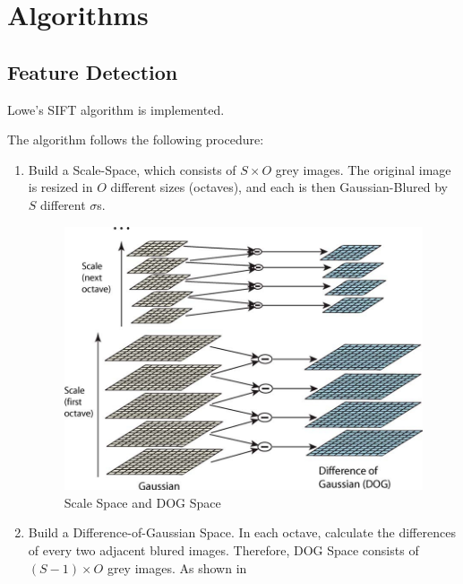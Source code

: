 
\section{Algorithms}
\subsection{Feature Detection}
Lowe's SIFT algorithm is implemented.

The algorithm follows the following procedure:
\begin{enumerate}
  \item Build a Scale-Space, which consists of $ S \times O$ grey images.
    The original image is resized in $ O$ different sizes (octaves), and each is then Gaussian-Blured
    by $ S$ different $ \sigma$s.
    \begin{figure}[H]
      \centering
      \includegraphics[scale=0.3]{res/dog.png}
      \caption{Scale Space and DOG Space \label{fig:dog}}
    \end{figure}

  \item Build a Difference-of-Gaussian Space.
    In each octave, calculate the differences of every two adjacent blured images.
    Therefore, DOG Space consists of $ (S - 1) \times O$ grey images.
    As shown in 


\end{enumerate}
